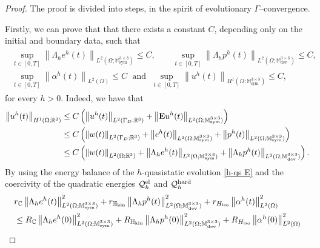 \documentclass[reqno,10pt]{amsart}
\numberwithin{equation}{section}
\theoremstyle{remark}
\newcommand{\C}{\mathbb{C}}
\newcommand{\M}{\mathbb{M}}
\newcommand{\calQ}{\mathcal{Q}}
\newcommand{\R}{\mathbb{R}}
\DeclareMathOperator{\dev}{dev}
\DeclareMathOperator{\sym}{sym}
\newcommand{\Dir}{D}
\newcommand{\E}{{\bf E}}
\newcommand{\Hkin}{\mathbb{H}_{\rm kin}}
\newcommand{\Hiso}{H_{\rm iso}}
\begin{document}
\begin{proof}
The proof is divided into steps, in the spirit of evolutionary $\Gamma$--convergence. 

\medskip
 \nopagebreak

Firstly, we can prove that that there exists a constant $C$, depending only on the initial and boundary data, such that
\begin{align} \label{boundness in time 1}
\begin{split}
    \sup_{t \in [0, T]} \left\|\Lambda_h e^h(t)\right\|_{L^2(\Omega;\M^{3 \times 3}_{\sym})} \leq C,
	\qquad \sup_{t \in [0, T]} \left\|\Lambda_h p^h(t)\right\|_{L^2(\Omega;\M^{3 \times 3}_{\dev})} \leq C,\\ \sup_{t \in [0, T]} \left\|\alpha^h(t)\right\|_{L^2(\Omega)} \leq C 
	\;\text{ and }\; \sup_{t \in [0, T]} \left\|u^h(t)\right\|_{H^1(\Omega;\M^{3 \times 3}_{\sym})} \leq C, 
\end{split}
\end{align}
for every $h>0$. 
Indeed, we have that
\begin{align}
\nonumber	\left\|u^h(t)\right\|_{H^1(\Omega;\R^3)} & \leq C \left(\left\|u^h(t)\right\|_{L^2(\Gamma_\Dir;\R^3)} + \left\|{\E}u^h(t)\right\|_{L^2(\Omega;\M^{3 \times 3}_{\sym})}\right)\\
\nonumber
	& \leq C \left(\left\|w(t)\right\|_{L^2(\Gamma_\Dir;\R^3)} + \left\|e^h(t)\right\|_{L^2(\Omega;\M^{3 \times 3}_{\sym})} + \left\|p^h(t)\right\|_{L^2(\Omega;\M^{3 \times 3}_{\sym})}\right)\\
	\label{mmarin1}
	& \leq C \left(\left\|w(t)\right\|_{L^2(\Omega;\R^3)} + \left\|\Lambda_h e^h(t)\right\|_{L^2(\Omega;\M^{3 \times 3}_{\sym})} + \left\|\Lambda_h p^h(t)\right\|_{L^2(\Omega;\M^{3 \times 3}_{\dev})}\right).
\end{align} 
By using the energy balance of the $h$-quasistatic evolution \ref{h-qs E} 
and the coercivity of the quadratic energies $\calQ^{\rm el}_{h}$ and $\calQ^{\rm hard}_{h}$
\begin{align*}
	& r_{\C} \left\|\Lambda_h e^h(t)\right\|_{L^2(\Omega;\M^{3 \times 3}_{\sym})}^2 + r_{\Hkin} \left\|\Lambda_h p^h(t)\right\|_{L^2(\Omega;\M^{3 \times 3}_{\dev})}^2 + r_{\Hiso} \left\|\alpha^h(t)\right\|_{L^2(\Omega)}^2 
	\\& \leq R_{\C} \left\|\Lambda_h e^h(0)\right\|_{L^2(\Omega;\M^{3 \times 3}_{\sym})}^2 + R_{\Hkin} \left\|\Lambda_h p^h(0)\right\|_{L^2(\Omega;\M^{3 \times 3}_{\dev})}^2 + R_{\Hiso} \left\|\alpha^h(0)\right\|_{L^2(\Omega)}^2 

\end{align*}
\end{proof}
\end{document}
